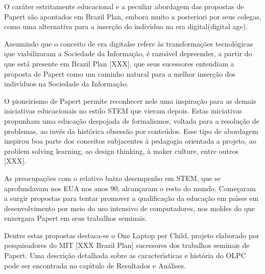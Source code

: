 \documentclass[
12pt,		%
openright,	%
twoside,  %
a4paper,			%
chapter=TITLE,		%
english,			%
french,				%
spanish,			%
brazil				%
]{USPSC-classe/USPSC}
\begin{document}
O car\'ater estritamente educacional e a peculiar abordagem das propostas de Papert s\~ao apontados em \textquotedbl Brazil Plan\textquotedbl  [XXX], embora muito a posteriori por seus colegas, como uma alternativa para a inser\c{c}\~ao do indiv\'{\i}duo na \textquotedbl era digital\textquotedbl  (digital age).










Assumindo que o conceito de \textquotedbl era digital\textquotedbl  se refere \`as transforma\c{c}\~oes tecnol\'ogicas que viabilizaram a  \textquotedbl Sociedade da Informa\c{c}\~ao\textquotedbl ,  \'e razo\'avel depreender, a partir do que est\'a presente em Brazil Plan [XXX], que seus sucessores entendiam a proposta de Papert como um caminho natural para a melhor inser\c{c}\~ao dos indiv\'{\i}duos na Sociedade da Informa\c{c}\~ao.










O pioneirismo de Papert permite reconhecer nele uma inspira\c{c}\~ao para as demais iniciativas educacionais no estilo STEM que vieram depois. Estas iniciativas propunham uma educa\c{c}\~ao despojada de formalismos, voltada para a resolu\c{c}\~ao de problemas, ao inv\'es da hist\'orica obsess\~ao por conte\'udos. Esse tipo de abordagem inspirou boa parte dos conceitos subjacentes \`a \textquotedbl pedagogia orientada a projeto\textquotedbl [XXX], ao \textquotedbl problem solving learning\textquotedbl [XXX], ao \textquotedbl design thinking, \`a \textquotedbl maker culture\textquotedbl , entre outros [XXX].










As preocupa\c{c}\~oes com o relativo baixo desempenho em STEM, que se aprofundavam nos EUA nos anos 90, alcan\c{c}aram o resto do mundo. Come\c{c}aram a surgir propostas para tentar promover a qualifica\c{c}\~ao da educa\c{c}\~ao em pa\'{\i}ses em desenvolvimento por meio do uso intensivo de computadores, nos moldes do que enxergara Papert em seus trabalhos seminais.










Dentre estas propostas destaca-se o \textquotedbl One Laptop per Child\textquotedbl , projeto elaborado por pesquisadores do MIT [XXX Brazil Plan] sucessores dos trabalhos seminais de Papert. Uma descri\c{c}\~ao detalhada sobre as caracter\'{\i}sticas e hist\'oria do OLPC pode ser encontrada no cap\'{\i}tulo de Resultados e An\'alises.
\end{document}
